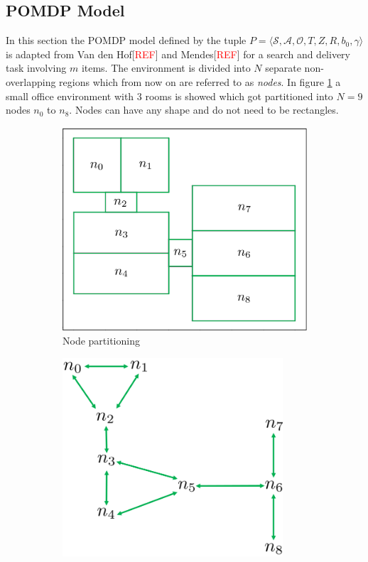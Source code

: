 \subsection{POMDP Model}\label{subsec:POMDPmodel}
In this section the POMDP model defined by the tuple $P = \langle \mathcal{S}, \mathcal{A}, \mathcal{O}, T, Z, R, b_0, \gamma \rangle$ is adapted from Van den Hof[\textcolor{red}{REF}] and Mendes[\textcolor{red}{REF}] for a search and delivery task involving $m$ items. The environment is divided into $N$ separate non-overlapping regions which from now on are referred to as \textit{nodes}. In figure \ref{subfig:nodes} a small office environment with 3 rooms is showed which got partitioned into $N=9$ nodes $n_0$ to $n_8$. Nodes can have any shape and do not need to be rectangles.
\begin{figure}
    \centering
    \begin{subfigure}[b]{0.48\textwidth}
        \includegraphics[width=1.0\textwidth]{Report/images/envsmall_l2.png}
        \caption{Node partitioning}
        \label{subfig:nodes}
    \end{subfigure}
    \begin{subfigure}[b]{0.48\textwidth}
    \includegraphics[width=0.9\textwidth]{Report/images/nodeconnectiongraph.png}

\end{subfigure}
\end{figure}
